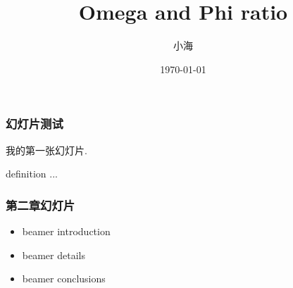 \documentclass{beamer}
\title{Omega and Phi ratio}
\author{小海}
\date{\today}
\begin{document}
\begin{frame}
  \titlepage
\end{frame}

\begin{frame}
  \frametitle{幻灯片测试} %
  我的第一张幻灯片.
  \begin{definition}
    definition ...
  \end{definition}
\end{frame}

\begin{frame}
  \frametitle{第二章幻灯片} %
  \begin{itemize}
  \item beamer introduction %
  \item beamer details %
  \item beamer conclusions
  \end{itemize}
\end{frame}
\end{document}
